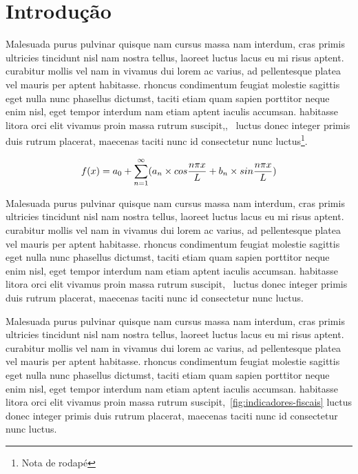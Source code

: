 \section{Introdução}
\label{sec:introducao}

Malesuada purus pulvinar quisque nam cursus massa nam interdum, cras primis ultricies tincidunt nisl nam nostra tellus, laoreet luctus lacus eu mi risus aptent. curabitur mollis vel nam in vivamus dui lorem ac varius, ad pellentesque platea vel mauris per aptent habitasse. rhoncus condimentum feugiat molestie sagittis eget nulla nunc phasellus dictumst, taciti etiam quam sapien porttitor neque enim nisl, eget tempor interdum nam etiam aptent iaculis accumsan. habitasse litora orci elit vivamus proin massa rutrum suscipit,,~\cite{manual} luctus donec integer primis duis rutrum placerat, maecenas taciti nunc id consectetur nunc luctus\footnote{Nota de rodapé}.  

\begin{equation}
    \centering
    \label{eq:equacao-1}
    f(x) = a_{0} + \sum_{n=1}^{\infty}(a_n \times cos\frac{n{\pi}x}{L} + b_{n} \times sin\frac{n{\pi}x}{L})
\end{equation}

Malesuada purus pulvinar quisque nam cursus massa nam interdum, cras primis ultricies tincidunt nisl nam nostra tellus, laoreet luctus lacus eu mi risus aptent. curabitur mollis vel nam in vivamus dui lorem ac varius, ad pellentesque platea vel mauris per aptent habitasse. rhoncus condimentum feugiat molestie sagittis eget nulla nunc phasellus dictumst, taciti etiam quam sapien porttitor neque enim nisl, eget tempor interdum nam etiam aptent iaculis accumsan. habitasse litora orci elit vivamus proin massa rutrum suscipit,~\cite{manual} luctus donec integer primis duis rutrum placerat, maecenas taciti nunc id consectetur nunc luctus.

\begin{table}[ht!]
    \centering
    \caption{Indicadores-fiscais}
    \label{fig:indicadores-fiscais}
\end{table}

Malesuada purus pulvinar quisque nam cursus massa nam interdum, cras primis ultricies tincidunt nisl nam nostra tellus, laoreet luctus lacus eu mi risus aptent. curabitur mollis vel nam in vivamus dui lorem ac varius, ad pellentesque platea vel mauris per aptent habitasse. rhoncus condimentum feugiat molestie sagittis eget nulla nunc phasellus dictumst, taciti etiam quam sapien porttitor neque enim nisl, eget tempor interdum nam etiam aptent iaculis accumsan. habitasse litora orci elit vivamus proin massa rutrum suscipit,~\autoref{fig:indicadores-fiscais} luctus donec integer primis duis rutrum placerat, maecenas taciti nunc id consectetur nunc luctus.
